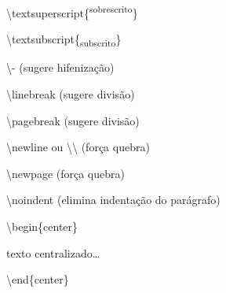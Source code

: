\documentclass[10pt,twoside,english,brazilian]{article}
\begin{document}
\begin{multicols}{3}
\textbackslash{}textsuperscript\{\textsuperscript{sobrescrito}\}

\textbackslash{}textsubscript\{\textsubscript{subscrito}\}

\textbackslash{}- (sugere hifenização)

\textbackslash{}linebreak (sugere divisão)

\textbackslash{}pagebreak (sugere divisão)

\textbackslash{}newline ou \textbackslash\textbackslash{} (força quebra)

\textbackslash{}newpage (força quebra)

\textbackslash{}noindent (elimina indentação do parágrafo)

\textbackslash{}begin\{center\}

\quad texto centralizado\dots

\textbackslash{}end\{center\}

\end{multicols}

\printbibliography[
  title=\refname\label{bibliografia}, %
]
\end{document}

